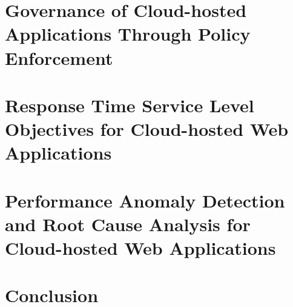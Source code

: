 \documentclass[oneside,12pt,final]{ucthesis-CA2012}
\begin{document}
\begin{mainmatter}
\chapter{Governance of Cloud-hosted Applications Through Policy Enforcement}
\label{sec:eager}


\chapter{Response Time Service Level Objectives for Cloud-hosted Web Applications}
\label{sec:cerebro}


\chapter{Performance Anomaly Detection and Root Cause Analysis for Cloud-hosted Web Applications}
\label{sec:roots}


\chapter{Conclusion}
\label{sec:conculsion}



%
%
%
%

\end{mainmatter}

\ssp


\end{document}
